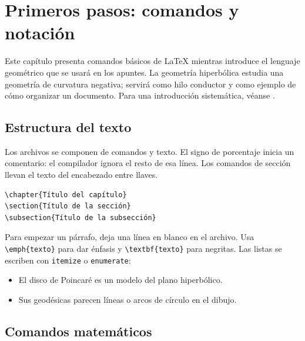 \chapter{Primeros pasos: comandos y notación}
\label{cap:comandos-basicos}

Este capítulo presenta comandos básicos de LaTeX mientras introduce el lenguaje geométrico que se usará en los apuntes. La geometría hiperbólica estudia una geometría de curvatura negativa; servirá como hilo conductor y como ejemplo de cómo organizar un documento. Para una introducción sistemática, véanse \cite{greenberg2008,anderson2005}.

\section{Estructura del texto}

Los archivos se componen de comandos y texto. El signo de porcentaje inicia un comentario: el compilador ignora el resto de esa línea. Los comandos de sección llevan el texto del encabezado entre llaves.

\begin{verbatim}
\chapter{Título del capítulo}
\section{Título de la sección}
\subsection{Título de la subsección}
\end{verbatim}

Para empezar un párrafo, deja una línea en blanco en el archivo. Usa \verb|\emph{texto}| para dar énfasis y \verb|\textbf{texto}| para negritas. Las listas se escriben con \verb|itemize| o \verb|enumerate|:

\begin{itemize}
  \item El disco de Poincaré es un modelo del plano hiperbólico.
  \item Sus geodésicas parecen líneas o arcos de círculo en el dibujo.
\end{itemize}

\section{Comandos matemáticos}

